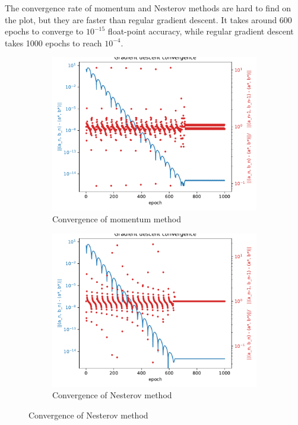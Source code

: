 \documentclass[12pt]{article}
\begin{document}
The convergence rate of momentum and Nesterov methods are hard to find on the plot, but they are faster than regular gradient descent.
It takes around 600 epochs to converge to \(10^{-15}\) float-point accuracy, while regular gradient descent takes 1000 epochs to reach \(10^{-4}\).
\begin{figure}[htbp]
    \centering
    \begin{subfigure}[t]{0.68\textwidth}
        \centering
        \includegraphics[width=\textwidth]{Homework1/ex2cm.pdf}
        \caption{Convergence of momentum method}
    \end{subfigure}\vspace{10pt}
    \begin{subfigure}[t]{0.68\textwidth}
        \centering
        \includegraphics[width=\textwidth]{Homework1/ex2cn.pdf}
        \caption{Convergence of Nesterov method}
    \end{subfigure}
\end{figure}
\end{document}
